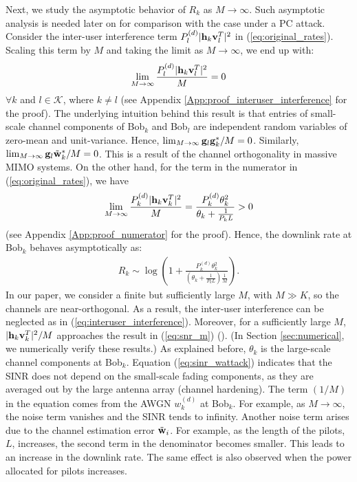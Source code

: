 \documentclass[draftclsnofoot, 12pt, onecolumn, journal]{IEEEtran}
\newcommand{\gv}{{\bf g}}
\newcommand{\hv}{{\bf h}}
\newcommand{\wv}{{\bf w}}
\newcommand{\vv}{{\bf v}}
\begin{document}
Next, we study the asymptotic behavior of $R_k$ as $M \rightarrow \infty$.
Such asymptotic analysis is needed later on for comparison with the case under a PC attack.
Consider the inter-user interference term $P_l^{(d)} \vert  \hv_k \vv_l^T \vert^2$ in (\ref{eq:original_rates}).
Scaling this term by $M$ and taking the limit as $M \rightarrow \infty$, we end up with:
%
\begin{align}
\lim_{M \rightarrow \infty} \frac{ P_l^{(d)} \vert \hv_k \vv_l^T \vert^2} {M} = 0
\label{eq:interuser_interference}
\end{align}
%
$\forall k$ and $l \in \mathcal{K}$, where $k \neq l$ (see Appendix \ref{App:proof_interuser_interference} for the proof).
The underlying intuition behind this result is that entries of small-scale channel components of Bob$_k$ and Bob$_l$ are independent random variables of zero-mean and unit-variance.
Hence, $\lim_{M \rightarrow \infty} \gv_l \gv_k^* / M = 0$.
Similarly, $\lim_{M \rightarrow \infty} \gv_l \tilde{\wv}_k^* / M = 0$.
This is a result of the channel orthogonality in massive MIMO systems.
On the other hand, for the term in the numerator in (\ref{eq:original_rates}), we have
%
\begin{align}
\lim_{M \rightarrow \infty} \frac{ P_k^{(d)} \vert \hv_k \vv_k^T \vert^2} {M} = \frac{ P_k^{(d)} \theta_k^2}{\theta_k + \frac{1}{P_k L}} > 0
\label{eq:snr_m}
\end{align}
%
(see Appendix \ref{App:proof_numerator} for the proof).
Hence, the downlink rate at Bob$_k$ behaves asymptotically as:
%
\begin{align}
R_k \sim \log \left( 1 + \frac{ P_k^{(d)} \theta_k^2}{(\theta_k + \frac{1}{P_k L}) \frac{1}{M}} \right).
\label{eq:sinr_wattack}
\end{align}
%
In our paper, we consider a finite but sufficiently large $M$, with $M \gg K$, so the channels are near-orthogonal.
As a result, the inter-user interference can be neglected as in (\ref{eq:interuser_interference}).
Moreover, for a sufficiently large $M$, $\vert \hv_k \vv_k^T \vert^2 / M$ approaches the result in (\ref{eq:snr_m}) (\cite{ Lu2014,Marzetta2010, fernandes2013inter}).
(In Section \ref{sec:numerical}, we numerically verify these results.)
As explained before, $\theta_k$ is the large-scale channel components at Bob$_k$.
Equation (\ref{eq:sinr_wattack}) indicates that the SINR does not depend on the small-scale fading components, as they are averaged out by the large antenna array (channel hardening).
The term $(1/M)$ in the equation comes from the AWGN $w_k^{(d)}$ at Bob$_k$.
For example, as $M \rightarrow \infty$, the noise term vanishes and the SINR tends to infinity.
Another noise term arises due to the channel estimation error $\tilde{\wv}_i$.
For example, as the length of the pilots, $L$, increases, the second term in the denominator becomes smaller.
This leads to an increase in the downlink rate.
The same effect is also observed when the power allocated for pilots increases.
\end{document}
